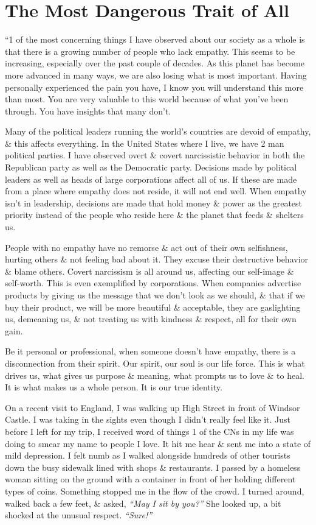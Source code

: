 \documentclass{article}
\numberwithin{equation}{section}
\begin{document}

\section{The Most Dangerous Trait of All}
``1 of the most concerning things I have observed about our society as a whole is that there is a growing number of people who lack empathy. This seems to be increasing, especially over the past couple of decades. As this planet has become more advanced in many ways, we are also losing what is most important. Having personally experienced the pain you have, I know you will understand this more than most. You are very valuable to this world because of what you've been through. You have insights that many don't.

Many of the political leaders running the world's countries are devoid of empathy, \& this affects everything. In the United States where I live, we have 2 man political parties. I have observed overt \& covert narcissistic behavior in both the Republican party as well as the Democratic party. Decisions made by political leaders as well as heads of large corporations affect all of us. If these are made from a place where empathy does not reside, it will not end well. When empathy isn't in leadership, decisions are made that hold money \& power as the greatest priority instead of the people who reside here \& the planet that feeds \& shelters us.

People with no empathy have no remorse \& act out of their own selfishness, hurting others \& not feeling bad about it. They excuse their destructive behavior \& blame others. Covert narcissism is all around us, affecting our self-image \& self-worth. This is even exemplified by corporations. When companies advertise products by giving us the message that we don't look as we should, \& that if we buy their product, we will be more beautiful \& acceptable, they are gaslighting us, demeaning us, \& not treating us with kindness \& respect, all for their own gain.

Be it personal or professional, when someone doesn't have empathy, there is a disconnection from their spirit. Our spirit, our soul is our life force. This is what drives us, what gives us purpose \& meaning, what prompts us to love \& to heal. It is what makes us a whole person. It is our true identity.

On a recent visit to England, I was walking up High Street in front of Windsor Castle. I was taking in the sights even though I didn't really feel like it. Just before I left for my trip, I received word of things 1 of the CNs in my life was doing to smear my name to people I love. It hit me hear \& sent me into a state of mild depression. I felt numb as I walked alongside hundreds of other tourists down the busy sidewalk lined with shops \& restaurants. I passed by a homeless woman sitting on the ground with a container in front of her holding different types of coins. Something stopped me in the flow of the crowd. I turned around, walked back a few feet, \& asked, \textit{``May I sit by you?''} She looked up, a bit shocked at the unusual respect. \textit{``Sure!''}
\end{document}
